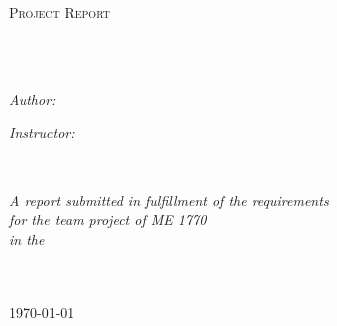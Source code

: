 \documentclass[
11pt, %
english, %
singlespacing, %
headsepline, %
]{StyleSheet} %
\author{Vishakh \textsc{Kumar}}
\begin{document}
\frontmatter %
\pagestyle{plain} %

\begin{titlepage}
\begin{center}

\vspace*{.06\textheight}
{\scshape\LARGE \univname\par}\vspace{1.5cm} %
\textsc{\Large Project Report}\\[0.5cm] %

\HRule \\[0.4cm] %
{\huge \bfseries \ttitle\par}\vspace{0.4cm} %
\HRule \\[1.5cm] %

\begin{minipage}[t]{0.4\textwidth}
\begin{flushleft} \large
\emph{Author:}\\
\href{http://www.johnsmith.com}{\authorname} %
\end{flushleft}
\end{minipage}
\begin{minipage}[t]{0.4\textwidth}
\begin{flushright} \large
\emph{Instructor:} \\
\href{http://www.me.gatech.edu/faculty/pucha}{\supname} %
\end{flushright}
\end{minipage}\\[3cm]

\vfill

\large \textit{A report submitted in fulfillment of the requirements\\ for the team project of ME 1770}\\[0.3cm] %
\textit{in the}\\[0.4cm]
\groupname\\\deptname\\[2cm] %

\vfill

{\large \today}\\[4cm] %

\vfill
\end{center}
\end{titlepage}
\end{document}

